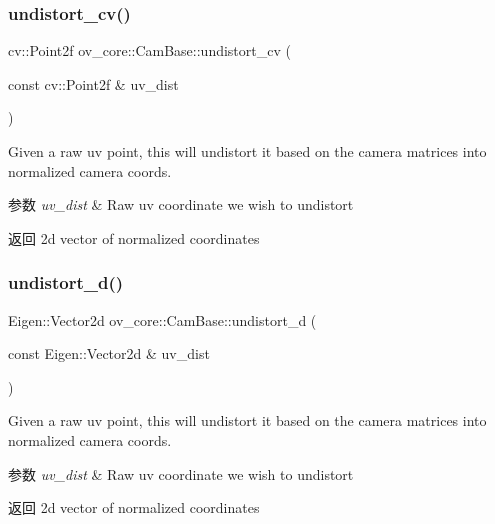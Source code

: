 \subsubsection{\texorpdfstring{undistort\+\_\+cv()}{undistort\_cv()}}
{\footnotesize\ttfamily cv\+::\+Point2f ov\+\_\+core\+::\+Cam\+Base\+::undistort\+\_\+cv (\begin{DoxyParamCaption}\item[{const cv\+::\+Point2f \&}]{uv\+\_\+dist }\end{DoxyParamCaption})\hspace{0.3cm}{\ttfamily [inline]}}



Given a raw uv point, this will undistort it based on the camera matrices into normalized camera coords. 


\begin{DoxyParams}{参数}
{\em uv\+\_\+dist} & Raw uv coordinate we wish to undistort \\
\hline
\end{DoxyParams}
\begin{DoxyReturn}{返回}
2d vector of normalized coordinates 
\end{DoxyReturn}
\mbox{\label{classov__core_1_1CamBase_ab910cf55ee13ca74eb4b8463ab32f1c4}} 
\subsubsection{\texorpdfstring{undistort\+\_\+d()}{undistort\_d()}}
{\footnotesize\ttfamily Eigen\+::\+Vector2d ov\+\_\+core\+::\+Cam\+Base\+::undistort\+\_\+d (\begin{DoxyParamCaption}\item[{const Eigen\+::\+Vector2d \&}]{uv\+\_\+dist }\end{DoxyParamCaption})\hspace{0.3cm}{\ttfamily [inline]}}



Given a raw uv point, this will undistort it based on the camera matrices into normalized camera coords. 


\begin{DoxyParams}{参数}
{\em uv\+\_\+dist} & Raw uv coordinate we wish to undistort \\
\hline
\end{DoxyParams}
\begin{DoxyReturn}{返回}
2d vector of normalized coordinates 
\end{DoxyReturn}
\mbox{\label{classov__core_1_1CamBase_ad0db03f97e5a12f5ad757f72e60f50e4}} 
